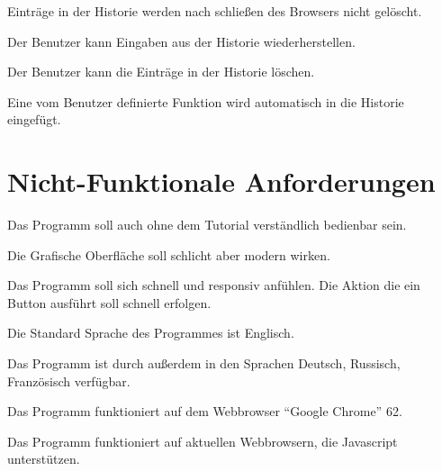 \documentclass[parskip=full,11pt,twoside]{scrartcl}
\begin{document}
Einträge in der Historie werden nach schließen des Browsers nicht gelöscht.

Der Benutzer kann Eingaben aus der Historie wiederherstellen.

Der Benutzer kann die Einträge in der Historie löschen.

Eine vom Benutzer definierte Funktion wird automatisch in die Historie eingefügt.




\section{Nicht-Funktionale Anforderungen}

Das Programm soll auch ohne dem Tutorial verständlich bedienbar sein.

Die Grafische Oberfläche soll schlicht aber modern wirken. 

Das Programm soll sich schnell und responsiv anfühlen. Die Aktion die ein Button ausführt soll schnell erfolgen. 

Die Standard Sprache des Programmes ist Englisch.

Das Programm ist durch außerdem in den Sprachen Deutsch, Russisch, Französisch verfügbar.

Das Programm funktioniert auf dem Webbrowser \enquote{Google Chrome} 62.

Das Programm funktioniert auf aktuellen Webbrowsern, die Javascript unterstützen.
\end{document}
